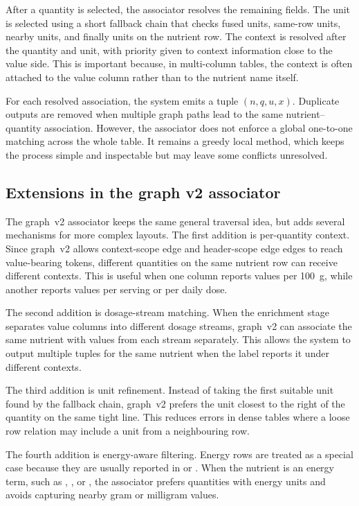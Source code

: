 After a quantity is selected, the associator resolves the remaining fields. The unit is selected using a short fallback chain that checks fused units, same-row units, nearby units, and finally units on the nutrient row. The context is resolved after the quantity and unit, with priority given to context information close to the value side. This is important because, in multi-column tables, the context is often attached to the value column rather than to the nutrient name itself.

For each resolved association, the system emits a tuple \((n, q, u, x)\). Duplicate outputs are removed when multiple graph paths lead to the same nutrient--quantity association. However, the associator does not enforce a global one-to-one matching across the whole table. It remains a greedy local method, which keeps the process simple and inspectable but may leave some conflicts unresolved.

\subsection{Extensions in the graph v2 associator}\label{sec:association-v2}

The graph~v2 associator keeps the same general traversal idea, but adds several mechanisms for more complex layouts. The first addition is per-quantity context. Since graph~v2 allows context-scope edge and header-scope edge edges to reach value-bearing tokens, different quantities on the same nutrient row can receive different contexts. This is useful when one column reports values per 100~g, while another reports values per serving or per daily dose.

The second addition is dosage-stream matching. When the enrichment stage separates value columns into different dosage streams, graph~v2 can associate the same nutrient with values from each stream separately. This allows the system to output multiple tuples for the same nutrient when the label reports it under different contexts.

The third addition is unit refinement. Instead of taking the first suitable unit found by the fallback chain, graph~v2 prefers the unit closest to the right of the quantity on the same tight line. This reduces errors in dense tables where a loose row relation may include a unit from a neighbouring row.

The fourth addition is energy-aware filtering. Energy rows are treated as a special case because they are usually reported in  or . When the nutrient is an energy term, such as , , or , the associator prefers quantities with energy units and avoids capturing nearby gram or milligram values.

